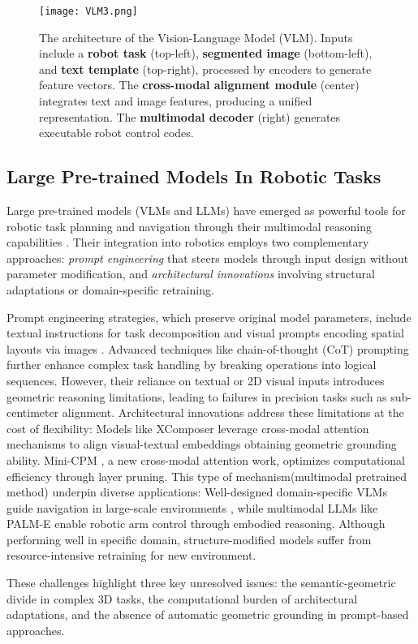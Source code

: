 \begin{figure}[t]
	\centering
	\texttt{[image: VLM3.png]}
	\caption{
		The architecture of the Vision-Language Model (VLM). Inputs include a \textbf{robot task} (top-left), \textbf{segmented image} (bottom-left), and \textbf{text template} (top-right), processed by encoders to generate feature vectors. The \textbf{cross-modal alignment module} (center) integrates text and image features, producing a unified representation. The \textbf{multimodal decoder} (right) generates executable robot control codes.
	}
	
	\label{fig_2}
\end{figure}



\subsection{Large Pre-trained Models In Robotic Tasks}

Large pre-trained models (VLMs and LLMs) have emerged as powerful tools for robotic task planning \cite{ref4-VLM-MSGM} and navigation \cite{ref2-visnav} through their multimodal reasoning capabilities \cite{ref3-autodrive}. Their integration into robotics employs two complementary approaches: \textit{prompt engineering} that steers models through input design without parameter modification, and \textit{architectural innovations} involving structural adaptations or domain-specific retraining. 

Prompt engineering strategies, which preserve original model parameters, include textual instructions for task decomposition \cite{ref33-saycan} and visual prompts encoding spatial layouts via images \cite{ref31-Blip2,ref32-LLAVAnext}. Advanced techniques like chain-of-thought (CoT) prompting \cite{ref43-cotRobot} further enhance complex task handling by breaking operations into logical sequences. However, their reliance on textual or 2D visual inputs introduces geometric reasoning limitations, leading to failures in precision tasks such as sub-centimeter alignment. 
Architectural innovations address these limitations at the cost of flexibility: Models like XComposer \cite{ref34-xcomposer} leverage cross-modal attention mechanisms to align visual-textual embeddings obtaining geometric grounding ability. Mini-CPM \cite{ref35-minicpm}, a new cross-modal attention work, optimizes computational efficiency through layer pruning. This type of mechanism(multimodal pretrained method) underpin diverse applications: Well-designed domain-specific VLMs guide navigation in large-scale environments \cite{ref40-VLMap,ref41-ViNG}, while multimodal LLMs like PALM-E \cite{ref42-Palm-E} enable robotic arm control through embodied reasoning. Although performing well in specific domain, structure-modified models suffer from resource-intensive retraining for new environment. 

These challenges highlight three key unresolved issues: the semantic-geometric divide in complex 3D tasks, the computational burden of architectural adaptations, and the absence of automatic geometric grounding in prompt-based approaches.